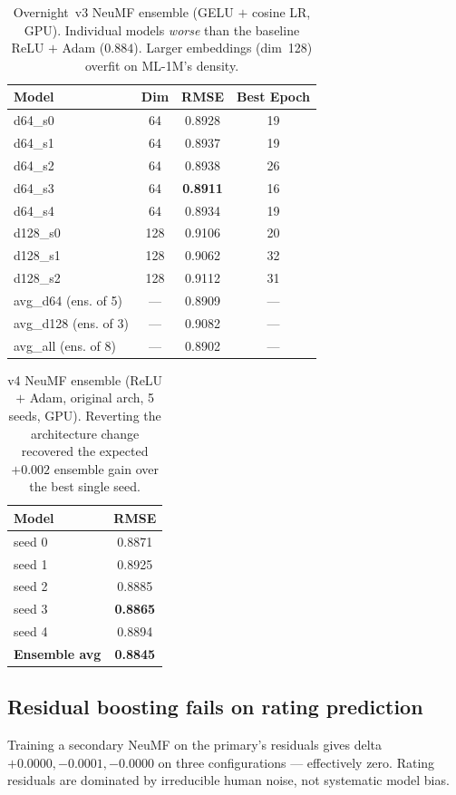 \documentclass[11pt,a4paper]{article}
\newcommand{\best}[1]{\textcolor{goodgreen}{\textbf{#1}}}
\begin{document}
\begin{table}[H]
\centering
\small
\caption{Overnight~v3 NeuMF ensemble (GELU $+$ cosine LR, GPU). Individual
models \emph{worse} than the baseline ReLU $+$ Adam ($0.884$). Larger
embeddings (dim~128) overfit on ML-1M's density.}
\label{tab:v3_ensemble}
\begin{tabular}{lccc}
\toprule
Model & Dim & RMSE & Best Epoch \\ \midrule
d64\_s0       &  64 & 0.8928 & 19 \\
d64\_s1       &  64 & 0.8937 & 19 \\
d64\_s2       &  64 & 0.8938 & 26 \\
d64\_s3       &  64 & \best{0.8911} & 16 \\
d64\_s4       &  64 & 0.8934 & 19 \\
d128\_s0      & 128 & 0.9106 & 20 \\
d128\_s1      & 128 & 0.9062 & 32 \\
d128\_s2      & 128 & 0.9112 & 31 \\ \midrule
avg\_d64 (ens. of 5)  & --- & 0.8909 & --- \\
avg\_d128 (ens. of 3) & --- & 0.9082 & --- \\
avg\_all (ens. of 8)  & --- & 0.8902 & --- \\
\bottomrule
\end{tabular}
\end{table}

\begin{table}[H]
\centering
\small
\caption{v4 NeuMF ensemble (ReLU $+$ Adam, original arch, 5 seeds, GPU).
Reverting the architecture change recovered the expected $+0.002$ ensemble
gain over the best single seed.}
\label{tab:v4_ensemble}
\begin{tabular}{lc}
\toprule
Model & RMSE \\ \midrule
seed 0                      & 0.8871 \\
seed 1                      & 0.8925 \\
seed 2                      & 0.8885 \\
seed 3                      & \best{0.8865} \\
seed 4                      & 0.8894 \\ \midrule
\textbf{Ensemble avg}       & \best{0.8845} \\
\bottomrule
\end{tabular}
\end{table}

\subsection{Residual boosting fails on rating prediction}
Training a secondary NeuMF on the primary's residuals gives delta
$+0.0000, -0.0001, -0.0000$ on three configurations --- effectively zero.
Rating residuals are dominated by irreducible human noise, not systematic
model bias.
\end{document}
